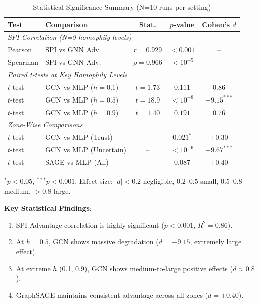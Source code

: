 \begin{table}[t]
\centering
\caption{Statistical Significance Summary (N=10 runs per setting)}
\label{tab:statistical_tests}
\begin{tabular}{@{}llccc@{}}
\toprule
\textbf{Test} & \textbf{Comparison} & \textbf{Stat.} & \textbf{$p$-value} & \textbf{Cohen's $d$} \\
\midrule
\multicolumn{5}{l}{\textit{SPI Correlation (N=9 homophily levels)}} \\
Pearson & SPI vs GNN Adv. & $r = 0.929$ & $< 0.001$ & -- \\
Spearman & SPI vs GNN Adv. & $\rho = 0.966$ & $< 10^{-5}$ & -- \\
\midrule
\multicolumn{5}{l}{\textit{Paired t-tests at Key Homophily Levels}} \\
$t$-test & GCN vs MLP ($h=0.1$) & $t = 1.73$ & $0.111$ & $0.86$ \\
$t$-test & GCN vs MLP ($h=0.5$) & $t = 18.9$ & $< 10^{-8}$ & $-9.15^{***}$ \\
$t$-test & GCN vs MLP ($h=0.9$) & $t = 1.40$ & $0.191$ & $0.76$ \\
\midrule
\multicolumn{5}{l}{\textit{Zone-Wise Comparisons}} \\
$t$-test & GCN vs MLP (Trust) & -- & $0.021^*$ & $+0.30$ \\
$t$-test & GCN vs MLP (Uncertain) & -- & $< 10^{-6}$ & $-9.67^{***}$ \\
$t$-test & SAGE vs MLP (All) & -- & $0.087$ & $+0.40$ \\
\bottomrule
\end{tabular}
\vspace{1mm}
\raggedright\small $^*p < 0.05$, $^{***}p < 0.001$. Effect size: $|d| < 0.2$ negligible, $0.2$--$0.5$ small, $0.5$--$0.8$ medium, $> 0.8$ large.
\end{table}

\textbf{Key Statistical Findings}:
\begin{enumerate}
    \item SPI-Advantage correlation is highly significant ($p < 0.001$, $R^2 = 0.86$).
    \item At $h = 0.5$, GCN shows massive degradation ($d = -9.15$, extremely large effect).
    \item At extreme $h$ (0.1, 0.9), GCN shows medium-to-large positive effects ($d \approx 0.8$).
    \item GraphSAGE maintains consistent advantage across all zones ($d = +0.40$).
\end{enumerate}


